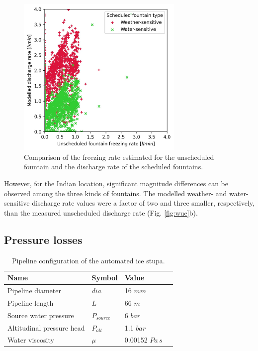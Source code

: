 \documentclass[tc, manuscript]{copernicus}
\begin{document}
\begin{figure}[htb]
\includegraphics[width=8cm]{Figures/simvsreal.jpg}

\caption{ Comparison of the freezing rate estimated for the unscheduled fountain and the discharge rate of the
scheduled fountains. }

\label{fig:simvsreal}
\end{figure}

However, for the Indian location, significant magnitude differences can be observed among the three kinds of
fountains. The modelled weather- and water-sensitive discharge rate values were a factor of two and three smaller, respectively,
than the measured unscheduled discharge rate (Fig. \ref{fig:wue}b).

\subsection{Pressure losses}

\begin{table}[htb]
\centering
\caption{Pipeline configuration of the automated ice stupa.}
\label{tab:pipe}
\begin{tabular}{@{}llll@{}}
\toprule
\textbf{Name} & \textbf{Symbol} & \textbf{Value} & \\ \midrule
\multicolumn{1}{|l}{Pipeline diameter}      & $dia$ & 16 $mm$ & \multicolumn{1}{l|}{} \\ \midrule
\multicolumn{1}{|l}{Pipeline length}        & $L$ & 66 $m$ & \multicolumn{1}{l|}{} \\ \midrule
\multicolumn{1}{|l}{Source water pressure} & $P_{source}$ & 6 $bar$  & \multicolumn{1}{l|}{} \\\midrule 
\multicolumn{1}{|l}{Altitudinal pressure head}  & $P_{alt}$ & 1.1 $bar$ & \multicolumn{1}{l|}{} \\ \midrule
\multicolumn{1}{|l}{Water viscosity}  & $\mu$ & 0.00152 $Pa\,s$ & \multicolumn{1}{l|}{} \\ \bottomrule
\end{tabular}
\end{table}
\end{document}
